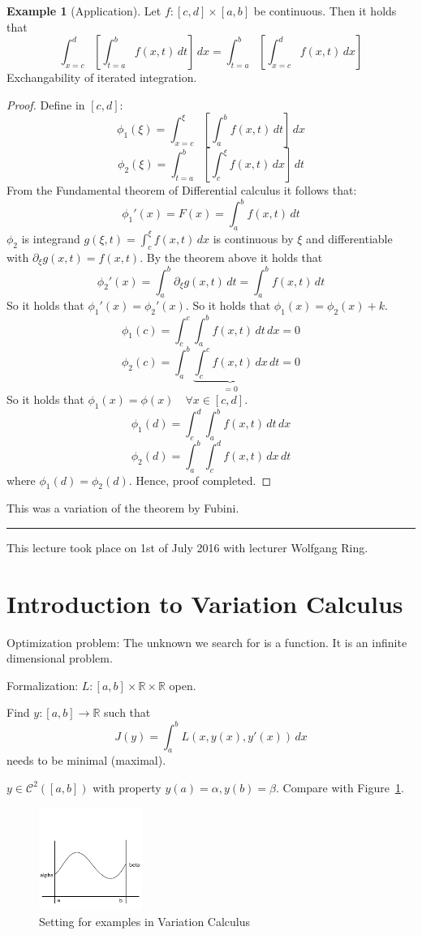 \documentclass[a4paper,landscape,twocolumn]{article}
\theoremstyle{definition}
\newtheorem{ex}{Example}
\newcommand\meta[3]{\hrule{} This #1 took place on #2 with lecturer #3.\par}
\begin{document}
\begin{ex}[Application]
  Let $f: [c,d] \times [a,b]$ be continuous. Then it holds that
  \[ \int_{x=c}^d \left[ \int_{t=a}^b f(x,t) \, dt \right] \, dx = \int_{t=a}^b \left[ \int_{x=c}^d f(x,t) \, dx \right] \]
  Exchangability of iterated integration.
\end{ex}
\begin{proof}
  Define in $[c,d]$:
  \[ \phi_1(\xi) = \int_{x=c}^\xi \left[ \int_a^b f(x,t) \, dt \right] \, dx \]
  \[ \phi_2(\xi) = \int_{t=a}^b \left[ \int_c^\xi f(x,t) \, dx \right] \, dt \]
  From the Fundamental theorem of Differential calculus it follows that:
  \[ \phi_1'(x) = F(x) = \int_a^b f(x,t) \, dt \]
  $\phi_2$ is integrand $g(\xi,t) = \int_c^\xi f(x,t) \, dx$ is continuous
  by $\xi$ and differentiable with $\partial_\xi g(x,t) = f(x,t)$.
  By the theorem above it holds that
  \[ \phi_2'(x) = \int_a^b \partial_\xi g(x,t) \, dt = \int_a^b f(x,t) \, dt \]
  So it holds that $\phi_1'(x) = \phi_2'(x)$.
  So it holds that $\phi_1(x) = \phi_2(x) + k$.
  \[ \phi_1(c) = \int_c^c \int_a^b f(x,t) \, dt \, dx = 0 \]
  \[ \phi_2(c) = \int_a^b \underbrace{\int_c^c f(x,t) \, dx}_{=0} \, dt = 0 \]
  So it holds that $\phi_1(x) = \phi(x) \quad \forall x \in [c,d]$.
  \[ \phi_1(d) = \int_c^d \int_a^b f(x,t) \, dt \, dx \]
  \[ \phi_2(d) = \int_a^b \int_c^d f(x,t) \, dx \, dt \]
  where $\phi_1(d) = \phi_2(d)$. Hence, proof completed.
\end{proof}

This was a variation of the theorem by Fubini.

\meta{lecture}{1st of July 2016}{Wolfgang Ring}

\section{Introduction to Variation Calculus}
%
Optimization problem:
The unknown we search for is a function.
It is an infinite dimensional problem.

Formalization:
$L: [a,b] \times \mathbb R \times \mathbb R$ open.

Find $y: [a,b] \to \mathbb R$ such that
\[ J(y) = \int_a^b L(x, y(x), y'(x)) \, dx \]
needs to be minimal (maximal).

$y \in \mathcal C^2([a,b])$ with property $y(a) = \alpha, y(b) = \beta$.
Compare with Figure~\ref{img:var}.
\begin{figure}[!h]
  \begin{center}
    \includegraphics[width=0.3\textwidth]{img/variation.pdf}
    \caption{Setting for examples in Variation Calculus}
    \label{img:var}
  \end{center}
\end{figure}
\end{document}
